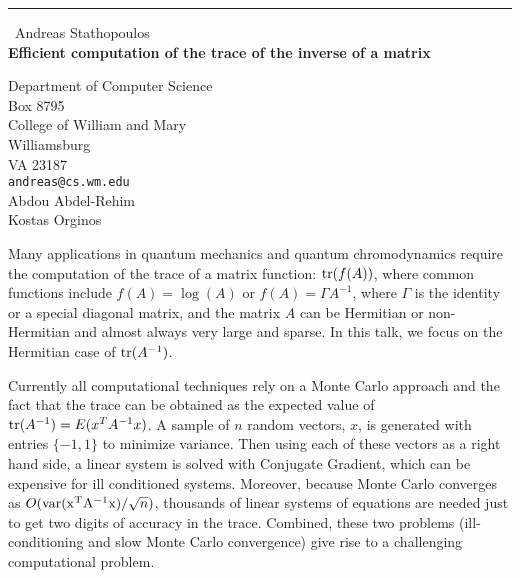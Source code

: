 \documentclass{report}
\begin{document}
\begin{center}
\rule{6in}{1pt} \
{\large Andreas Stathopoulos \\
{\bf Efficient computation of the trace of the inverse of a matrix}}

Department of Computer Science \\ Box 8795 \\ College of William and Mary \\ Williamsburg \\ VA 23187
\\
{\tt andreas@cs.wm.edu}\\
Abdou Abdel-Rehim\\
Kostas Orginos\end{center}

Many applications in quantum mechanics and quantum chromodynamics require
the computation of the trace of a matrix function: ${\rm tr}(f(A))$,
where common functions include $f(A) = \log(A)$ or $f(A) = \Gamma A^{-1}$,
where $\Gamma$ is the identity or a special diagonal matrix, and the
matrix $A$ can be Hermitian or non-Hermitian and almost always very large
and sparse. In this talk, we focus on the Hermitian case of ${\rm tr}(A^{-1})$.

Currently all computational techniques rely on a Monte Carlo approach and
the fact that the trace can be obtained as the expected value of
${\rm tr}(A^{-1}) = E(x^T A^{-1} x)$.
A sample of $n$ random vectors, $x$, is generated with entries $\{-1,1\}$
to minimize variance.
Then using each of these vectors as a right hand side, a linear system
is solved with Conjugate Gradient, which can be expensive for ill
conditioned systems.
Moreover, because Monte Carlo converges as $O({\rm var(x^TA^{-1}x)}/\sqrt{n})$,
thousands of linear systems of equations are needed just to get two digits
of accuracy in the trace. Combined, these two problems (ill-conditioning and
slow Monte Carlo convergence) give rise to a challenging computational problem.
\end{document}
